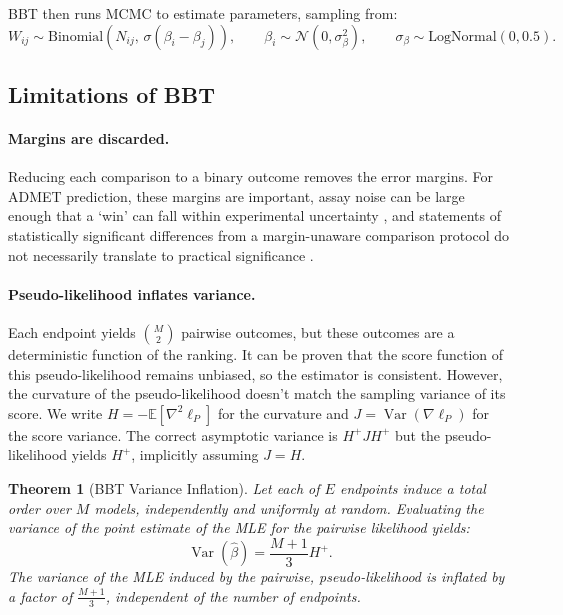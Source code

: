 \documentclass{article}
\newtheorem{theorem}{Theorem}[section]
\DeclareMathOperator{\Var}{Var}
\begin{document}
BBT then runs MCMC to estimate parameters, sampling from:
\begin{equation}
  W_{ij} \sim \mathrm{Binomial}\!\left(N_{ij},\, \sigma(\beta_i - \beta_j)\right),
  \qquad
  \beta_i \sim \mathcal{N}(0, \sigma_\beta^2),
  \qquad
  \sigma_\beta \sim \mathrm{LogNormal}(0, 0.5).
  \label{eq:bbt}
\end{equation}

\subsection{Limitations of BBT}
\label{sec:limitations}
\paragraph{Margins are discarded.}
Reducing each comparison to a binary outcome removes the error margins. For ADMET prediction, these margins are important, assay noise can be large enough that a `win' can fall within experimental uncertainty \citep{kramer2012, brown2009, landrum2024}, and statements of statistically significant differences from a margin-unaware comparison protocol do not necessarily translate to practical significance \citep{ash2025}.

\paragraph{Pseudo-likelihood inflates variance.}
Each endpoint yields $\binom{M}{2}$ pairwise outcomes, but these outcomes are a deterministic function of the ranking. It can be proven that the score function of this pseudo-likelihood remains unbiased, so the estimator is consistent. However, the curvature of the pseudo-likelihood doesn't match the sampling variance of its score. We write $H = -\mathbb{E}[\nabla^2\ell_P]$ for the curvature and $J = \Var(\nabla\ell_P)$ for the score variance. The correct asymptotic variance is $H^+JH^+$ but the pseudo-likelihood yields $H^+$, implicitly assuming $J = H$.
\begin{theorem}[BBT Variance Inflation]
    Let each of $E$ endpoints induce a total order over $M$ models, independently and uniformly at random. Evaluating the variance of the point estimate of the MLE for the pairwise likelihood yields:
    \begin{equation}
        \Var(\hat{\beta}) = \frac{M+1}{3}H^+.
    \end{equation}
    The variance of the MLE induced by the pairwise, pseudo-likelihood is inflated by a factor of $\frac{M+1}{3}$, independent of the number of endpoints.
\end{theorem}
\end{document}
